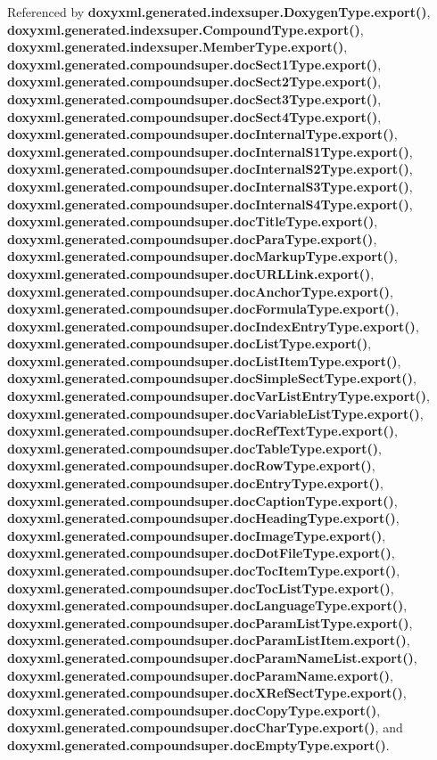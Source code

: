 Referenced by {\bf doxyxml.\+generated.\+indexsuper.\+Doxygen\+Type.\+export()}, {\bf doxyxml.\+generated.\+indexsuper.\+Compound\+Type.\+export()}, {\bf doxyxml.\+generated.\+indexsuper.\+Member\+Type.\+export()}, {\bf doxyxml.\+generated.\+compoundsuper.\+doc\+Sect1\+Type.\+export()}, {\bf doxyxml.\+generated.\+compoundsuper.\+doc\+Sect2\+Type.\+export()}, {\bf doxyxml.\+generated.\+compoundsuper.\+doc\+Sect3\+Type.\+export()}, {\bf doxyxml.\+generated.\+compoundsuper.\+doc\+Sect4\+Type.\+export()}, {\bf doxyxml.\+generated.\+compoundsuper.\+doc\+Internal\+Type.\+export()}, {\bf doxyxml.\+generated.\+compoundsuper.\+doc\+Internal\+S1\+Type.\+export()}, {\bf doxyxml.\+generated.\+compoundsuper.\+doc\+Internal\+S2\+Type.\+export()}, {\bf doxyxml.\+generated.\+compoundsuper.\+doc\+Internal\+S3\+Type.\+export()}, {\bf doxyxml.\+generated.\+compoundsuper.\+doc\+Internal\+S4\+Type.\+export()}, {\bf doxyxml.\+generated.\+compoundsuper.\+doc\+Title\+Type.\+export()}, {\bf doxyxml.\+generated.\+compoundsuper.\+doc\+Para\+Type.\+export()}, {\bf doxyxml.\+generated.\+compoundsuper.\+doc\+Markup\+Type.\+export()}, {\bf doxyxml.\+generated.\+compoundsuper.\+doc\+U\+R\+L\+Link.\+export()}, {\bf doxyxml.\+generated.\+compoundsuper.\+doc\+Anchor\+Type.\+export()}, {\bf doxyxml.\+generated.\+compoundsuper.\+doc\+Formula\+Type.\+export()}, {\bf doxyxml.\+generated.\+compoundsuper.\+doc\+Index\+Entry\+Type.\+export()}, {\bf doxyxml.\+generated.\+compoundsuper.\+doc\+List\+Type.\+export()}, {\bf doxyxml.\+generated.\+compoundsuper.\+doc\+List\+Item\+Type.\+export()}, {\bf doxyxml.\+generated.\+compoundsuper.\+doc\+Simple\+Sect\+Type.\+export()}, {\bf doxyxml.\+generated.\+compoundsuper.\+doc\+Var\+List\+Entry\+Type.\+export()}, {\bf doxyxml.\+generated.\+compoundsuper.\+doc\+Variable\+List\+Type.\+export()}, {\bf doxyxml.\+generated.\+compoundsuper.\+doc\+Ref\+Text\+Type.\+export()}, {\bf doxyxml.\+generated.\+compoundsuper.\+doc\+Table\+Type.\+export()}, {\bf doxyxml.\+generated.\+compoundsuper.\+doc\+Row\+Type.\+export()}, {\bf doxyxml.\+generated.\+compoundsuper.\+doc\+Entry\+Type.\+export()}, {\bf doxyxml.\+generated.\+compoundsuper.\+doc\+Caption\+Type.\+export()}, {\bf doxyxml.\+generated.\+compoundsuper.\+doc\+Heading\+Type.\+export()}, {\bf doxyxml.\+generated.\+compoundsuper.\+doc\+Image\+Type.\+export()}, {\bf doxyxml.\+generated.\+compoundsuper.\+doc\+Dot\+File\+Type.\+export()}, {\bf doxyxml.\+generated.\+compoundsuper.\+doc\+Toc\+Item\+Type.\+export()}, {\bf doxyxml.\+generated.\+compoundsuper.\+doc\+Toc\+List\+Type.\+export()}, {\bf doxyxml.\+generated.\+compoundsuper.\+doc\+Language\+Type.\+export()}, {\bf doxyxml.\+generated.\+compoundsuper.\+doc\+Param\+List\+Type.\+export()}, {\bf doxyxml.\+generated.\+compoundsuper.\+doc\+Param\+List\+Item.\+export()}, {\bf doxyxml.\+generated.\+compoundsuper.\+doc\+Param\+Name\+List.\+export()}, {\bf doxyxml.\+generated.\+compoundsuper.\+doc\+Param\+Name.\+export()}, {\bf doxyxml.\+generated.\+compoundsuper.\+doc\+X\+Ref\+Sect\+Type.\+export()}, {\bf doxyxml.\+generated.\+compoundsuper.\+doc\+Copy\+Type.\+export()}, {\bf doxyxml.\+generated.\+compoundsuper.\+doc\+Char\+Type.\+export()}, and {\bf doxyxml.\+generated.\+compoundsuper.\+doc\+Empty\+Type.\+export()}.



